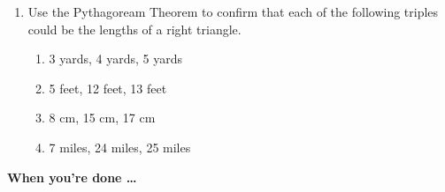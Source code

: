 \begin{enumerate}
\begin{center}
\end{center}

\begin{enumerate}
    \item Draw a right triangle showing just the left-hand side of the roof and label the sides of your triangle with the information given in the story, or a letter if we don't know the length.
    \item Use the Pythagoream Theorem to find the length of the rafter.
    \item Did anything about the length surprise you?
\end{enumerate}

\item Use the Pythagoream Theorem  to confirm that each of the following triples could be the lengths of a right triangle. 
\begin{enumerate}
    \item 3 yards, 4 yards, 5 yards
    \item 5 feet, 12 feet, 13 feet
    \item 8 cm, 15 cm, 17 cm
    \item 7 miles, 24 miles, 25 miles
\end{enumerate}

\end{enumerate}

\bigskip

\noindent \textbf{When you're done \ldots}

